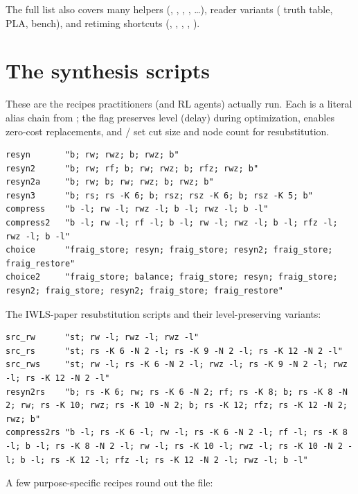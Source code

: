 \noindent The full list also covers many  helpers (,
, , , \dots), reader variants ( truth table,
 PLA,  bench), and retiming shortcuts (, ,
, , ).

\section{The synthesis scripts}

These are the recipes practitioners (and RL agents) actually run. Each is a
literal alias chain from ; the  flag preserves level (delay)
during optimization,  enables zero-cost replacements, and /
set cut size and node count for resubstitution.

\begin{lstlisting}[style=abcshell]
resyn       "b; rw; rwz; b; rwz; b"
resyn2      "b; rw; rf; b; rw; rwz; b; rfz; rwz; b"
resyn2a     "b; rw; b; rw; rwz; b; rwz; b"
resyn3      "b; rs; rs -K 6; b; rsz; rsz -K 6; b; rsz -K 5; b"
compress    "b -l; rw -l; rwz -l; b -l; rwz -l; b -l"
compress2   "b -l; rw -l; rf -l; b -l; rw -l; rwz -l; b -l; rfz -l; rwz -l; b -l"
choice      "fraig_store; resyn; fraig_store; resyn2; fraig_store; fraig_restore"
choice2     "fraig_store; balance; fraig_store; resyn; fraig_store; resyn2; fraig_store; resyn2; fraig_store; fraig_restore"
\end{lstlisting}

\noindent The IWLS-paper resubstitution scripts and their level-preserving
variants:

\begin{lstlisting}[style=abcshell]
src_rw      "st; rw -l; rwz -l; rwz -l"
src_rs      "st; rs -K 6 -N 2 -l; rs -K 9 -N 2 -l; rs -K 12 -N 2 -l"
src_rws     "st; rw -l; rs -K 6 -N 2 -l; rwz -l; rs -K 9 -N 2 -l; rwz -l; rs -K 12 -N 2 -l"
resyn2rs    "b; rs -K 6; rw; rs -K 6 -N 2; rf; rs -K 8; b; rs -K 8 -N 2; rw; rs -K 10; rwz; rs -K 10 -N 2; b; rs -K 12; rfz; rs -K 12 -N 2; rwz; b"
compress2rs "b -l; rs -K 6 -l; rw -l; rs -K 6 -N 2 -l; rf -l; rs -K 8 -l; b -l; rs -K 8 -N 2 -l; rw -l; rs -K 10 -l; rwz -l; rs -K 10 -N 2 -l; b -l; rs -K 12 -l; rfz -l; rs -K 12 -N 2 -l; rwz -l; b -l"
\end{lstlisting}

\noindent A few purpose-specific recipes round out the file:

